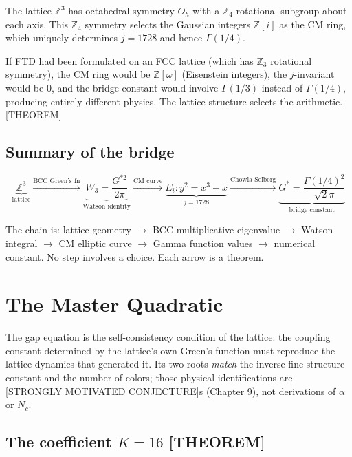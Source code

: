 \documentclass[
  11pt,
  letterpaper,
  twoside,
  openany]{book}
\makeatletter
\let\orig@section\section
\renewcommand{\section}{\needspace{8\baselineskip}\orig@section}
\newcommand{\Gs}{G^{*}{}}
\newcommand{\Gssq}{G^{*2}{}}      %
\makeatother
\begin{document}
The lattice \(\mathbb{Z}^3\) has octahedral symmetry \(O_h\) with a
\(\mathbb{Z}_4\) rotational subgroup about each axis. This
\(\mathbb{Z}_4\) symmetry selects the Gaussian integers
\(\mathbb{Z}[i]\) as the CM ring, which uniquely determines \(j = 1728\)
and hence \(\Gamma(1/4)\).

If FTD had been formulated on an FCC lattice (which has \(\mathbb{Z}_3\)
rotational symmetry), the CM ring would be \(\mathbb{Z}[\omega]\)
(Eisenstein integers), the \(j\)-invariant would be 0, and the bridge
constant would involve \(\Gamma(1/3)\) instead of \(\Gamma(1/4)\),
producing entirely different physics. The lattice structure selects the
arithmetic. {[}THEOREM{]}

\section{Summary of the bridge}\label{summary-of-the-bridge}

\[
\underbrace{\mathbb{Z}^3}_{\text{lattice}} \xrightarrow{\text{BCC Green's fn}} \underbrace{W_3 = \frac{\Gssq}{2\pi}}_{\text{Watson identity}} \xrightarrow{\text{CM curve}} \underbrace{E_i: y^2 = x^3 - x}_{\text{$j = 1728$}} \xrightarrow{\text{Chowla-Selberg}} \underbrace{\Gs = \frac{\Gamma(1/4)^2}{\sqrt{2}\pi}}_{\text{bridge constant}}
\]

The chain is: lattice geometry \(\to\) BCC multiplicative eigenvalue
\(\to\) Watson integral \(\to\) CM elliptic curve \(\to\) Gamma function
values \(\to\) numerical constant. No step involves a choice. Each arrow
is a theorem.

\chapter{The Master Quadratic}\label{sec-quadratic}

The gap equation is the self-consistency condition of the lattice: the
coupling constant determined by the lattice's own Green's function must
reproduce the lattice dynamics that generated it. Its two roots
\emph{match} the inverse fine structure constant and the number of
colors; those physical identifications are {[}STRONGLY MOTIVATED
CONJECTURE{]}s (Chapter 9), not derivations of \(\alpha\) or \(N_c\).

\section{\texorpdfstring{The coefficient \(K = 16\)
{[}THEOREM{]}}{The coefficient K = 16 {[}THEOREM{]}}}\label{the-coefficient-k-16-theorem}
\end{document}
